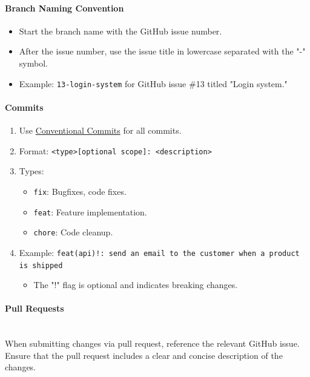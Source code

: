 \documentclass[12pt,a4paper]{article}
\begin{document}
\begin{spacing}{1.5}
    \paragraph{Branch Naming Convention}
    \begin{itemize}
        \item Start the branch name with the GitHub issue number.
        \item After the issue number, use the issue title in lowercase separated with the "-"
              symbol.
        \item Example: \texttt{13-login-system} for GitHub issue \#13 titled "Login system."
    \end{itemize}

    \paragraph{Commits}
    \begin{enumerate}
        \item Use \href{https://www.conventionalcommits.org/en/v1.0.0/}{Conventional Commits}
              for all commits.
        \item Format: \texttt{<type>[optional scope]: <description>}
        \item Types:
              \begin{itemize}
                  \item \texttt{fix}: Bugfixes, code fixes.
                  \item \texttt{feat}: Feature implementation.
                  \item \texttt{chore}: Code cleanup.
              \end{itemize}
        \item Example: \texttt{feat(api)!: send an email to the customer when a product is
                  shipped}
              \begin{itemize}
                  \item The "!" flag is optional and indicates breaking changes.
              \end{itemize}
    \end{enumerate}

    \paragraph{Pull Requests} \mbox{} \\ \indent
    When submitting changes via pull request, reference the relevant GitHub issue. Ensure that the pull request includes a clear and concise description of the changes.


\end{spacing}
\end{document}
